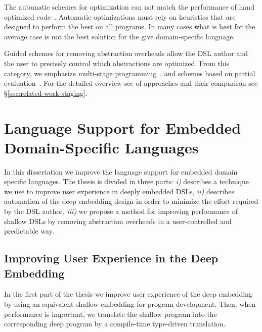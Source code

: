 The automatic schemes for optimization can not match the performance of hand optimized
 code~\cite{rompf_optimizing_2013}. Automatic optimizations must rely on heuristics that
 are designed to perform the best on all programs. In many cases what is best for the
 average case is not the best solution for the give domain-specific language.

Guided schemes for removing abstraction overheads allow the DSL author and the user
to precisely control which abstractions are optimized. From this category, we emphasize
multi-stage programming~\cite{taha_multi-stage_1997,taha2004gentle}, and schemes
based on partial evaluation~\cite{jones1993partial,brady2010scrapping}. For the detailed
overview see of approaches and their comparison see \S \ref{sec:related-work-staging}.

\section{Language Support for Embedded Domain-Specific Languages}
\label{sec:improving-language-support}

In this dissertation we improve the language support for embedded domain specific languages. The
 thesis is divided in three parts: \emph{i)} describes a technique we use to improve
 user experience in deeply embedded DSLs, \emph{ii)} describes automation of the
 deep embedding design in order to minimize the effort required by the DSL author, \emph{iii)}
 we propose a method for improving performance of shallow DSLs by removing abstraction overheads
 in a user-controlled and predictable way.

\subsection{Improving User Experience in the Deep Embedding}
\label{sec:user-experience}

In the first part of the thesis we improve user experience of the deep embedding by
 using an equivalent shallow embedding for program development. Then, when performance is
 important, we translate the shallow program into the corresponding deep program
 by a compile-time type-driven translation.

